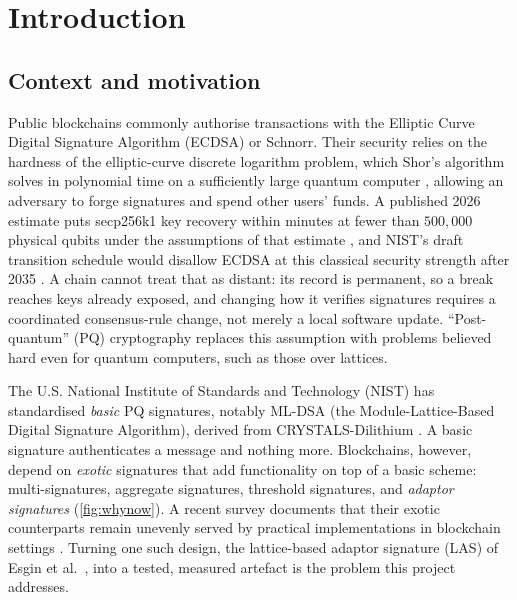\chapter{Introduction}
\label{ch:intro}

\section{Context and motivation}
\label{sec:motivation}

Public blockchains commonly authorise transactions with the Elliptic Curve Digital
Signature Algorithm (ECDSA) or Schnorr. Their security relies on the hardness of the
elliptic-curve discrete logarithm problem, which Shor's algorithm solves in polynomial
time on a sufficiently large quantum computer \cite{shor1999polynomial}, allowing an
adversary to forge signatures and spend other users' funds. A published 2026 estimate
puts secp256k1 key recovery within minutes at fewer than $500{,}000$ physical qubits under the assumptions of that estimate
\cite{babbush2026securing}, and NIST's draft transition schedule would disallow
ECDSA at this classical security
strength after 2035 \cite{nistir8547}. A
chain cannot treat that as distant: its record is permanent, so a break reaches keys
already exposed, and changing how it verifies signatures requires a coordinated
consensus-rule change, not merely a local software update. ``Post-quantum'' (PQ)
cryptography replaces this assumption with
problems believed hard even for quantum computers, such as those over lattices.

The U.S. National Institute of Standards and Technology (NIST) has standardised
\emph{basic} PQ signatures, notably ML-DSA (the Module-Lattice-Based Digital Signature
Algorithm), derived from CRYSTALS-Dilithium
\cite{1274601,ducas2018crystals}. A basic signature authenticates a message and nothing
more. Blockchains, however, depend on \emph{exotic} signatures that add functionality
on top of a basic scheme: multi-signatures, aggregate signatures, threshold
signatures, and \emph{adaptor signatures} (\cref{fig:whynow}). A recent survey documents that their exotic
counterparts remain unevenly served by practical implementations
in blockchain settings \cite{buser2023survey}. Turning one such design, the lattice-based adaptor signature (LAS) of Esgin et al.\ \cite{esgin2020post}, into a tested, measured artefact is the problem this project addresses.

